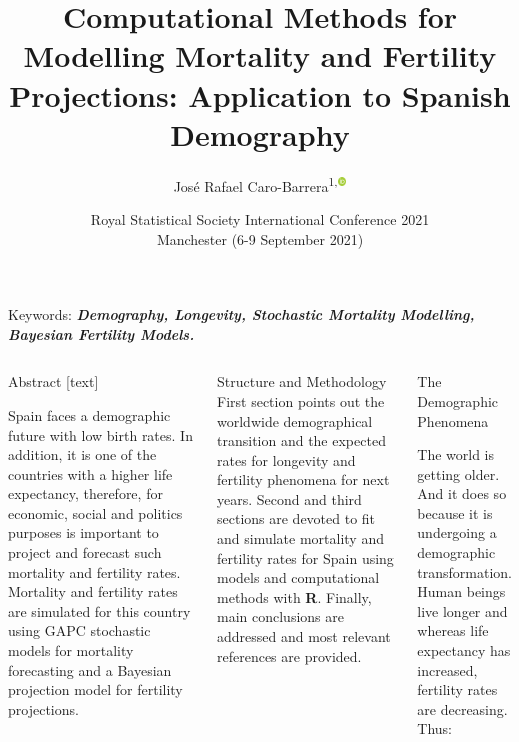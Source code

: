 \documentclass[]{beamer}
\date{Royal Statistical Society International Conference 2021\\
Manchester (6-9 September 2021)}
\title{Computational Methods for Modelling Mortality and Fertility Projections: Application to Spanish Demography}
\author{Jos\'e Rafael Caro-Barrera\textsuperscript{1,\includegraphics[height=0.75em]{orcid.png}}}
\institute{\textsuperscript{1} Dept. of Statistics, Econometrics, Operational Research and Applied Economics\\ University of C\'ordoba -- Spain}
\begin{document}
\begin{frame}{\vspace{1ex}\hfill Keywords: \bfseries \textit{Demography, Longevity, Stochastic Mortality Modelling, Bayesian Fertility Models.}}
	\begin{columns}[t]

\vspace{-1.5cm}
\begin{block}{Abstract}
			\vspace{-0.5cm}%
				[text]
				
				
				Spain faces a demographic future with low birth rates. In addition, it is one of the countries with a higher life expectancy, therefore, for economic, social and politics purposes is important to project and forecast such mortality and fertility rates. Mortality and fertility rates are simulated for this country using GAPC stochastic models for mortality forecasting and a Bayesian projection model for fertility projections.
		\end{block}
		
		\vspace{-0.5cm}  %
		\begin{block}{Structure and Methodology}
			\setlength{\parindent}{1.2em}
			\setlength{\parskip}{0.5ex}
			First section points out the worldwide demographical transition and the expected rates for longevity and fertility phenomena for next years. Second and third sections are devoted to fit and simulate mortality and fertility rates for Spain using models and computational methods with \textbf{R}. Finally, main conclusions are addressed and most relevant references are provided. 
		\end{block}
		
\vspace{-0.5cm}

		\begin{block}{The Demographic Phenomena}
			\begin{multicols}{2}
				\setlength{\parindent}{1.2em}
				\setlength{\parskip}{1ex}

				The world is getting older. And it does so because it is undergoing a demographic transformation. Human beings live longer and whereas life expectancy has increased, fertility rates are decreasing. Thus:


\end{multicols}
\end{block}
\end{columns}
\end{frame}
\end{document}
